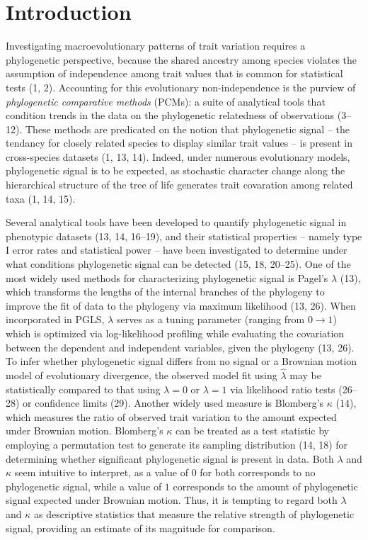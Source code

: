 \documentclass[
]{article}
\begin{document}
\newpage

\hypertarget{introduction}{%
\section{Introduction}\label{introduction}}

Investigating macroevolutionary patterns of trait variation requires a
phylogenetic perspective, because the shared ancestry among species
violates the assumption of independence among trait values that is
common for statistical tests (1, 2). Accounting for this evolutionary
non-independence is the purview of \emph{phylogenetic comparative
methods} (PCMs): a suite of analytical tools that condition trends in
the data on the phylogenetic relatedness of observations (3--12). These
methods are predicated on the notion that phylogenetic signal -- the
tendancy for closely related species to display similar trait values --
is present in cross-species datasets (1, 13, 14). Indeed, under numerous
evolutionary models, phylogenetic signal is to be expected, as
stochastic character change along the hierarchical structure of the tree
of life generates trait covaration among related taxa (1, 14, 15).
\hfill\break

Several analytical tools have been developed to quantify phylogenetic
signal in phenotypic datasets (13, 14, 16--19), and their statistical
properties -- namely type I error rates and statistical power -- have
been investigated to determine under what conditions phylogenetic signal
can be detected (15, 18, 20--25). One of the most widely used methods
for characterizing phylogenetic signal is Pagel's \(\lambda\) (13),
which transforms the lengths of the internal branches of the phylogeny
to improve the fit of data to the phylogeny via maximum likelihood (13,
26). When incorporated in PGLS, \(\lambda\) serves as a tuning parameter
(ranging from \(0\rightarrow1\)) which is optimized via log-likelihood
profiling while evaluating the covariation between the dependent and
independent variables, given the phylogeny (13, 26). To infer whether
phylogenetic signal differs from no signal or a Brownian motion model of
evolutionary divergence, the observed model fit using \(\hat\lambda\)
may be statistically compared to that using \(\lambda=0\) or
\(\lambda=1\) via likelihood ratio tests (26--28) or confidence limits
(29). Another widely used measure is Blomberg's \(\kappa\) (14), which
measures the ratio of observed trait variation to the amount expected
under Brownian motion. Blomberg's \(\kappa\) can be treated as a test
statistic by employing a permutation test to generate its sampling
distribution (14, 18) for determining whether significant phylogenetic
signal is present in data. Both \(\lambda\) and \(\kappa\) seem
intuitive to interpret, as a value of \(0\) for both corresponds to no
phylogenetic signal, while a value of \(1\) corresponds to the amount of
phylogenetic signal expected under Brownian motion. Thus, it is tempting
to regard both \(\lambda\) and \(\kappa\) as descriptive statistics that
measure the relative strength of phylogenetic signal, providing an
estimate of its magnitude for comparison. \hfill\break
\end{document}
